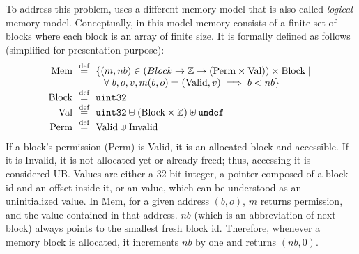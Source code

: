 To address this problem, \cc{} uses a different memory model that is also called {\it logical} memory model.
Conceptually, in this model memory consists of a finite set of blocks where each block is an array of finite size.
It is formally defined as follows (simplified for presentation purpose):
\[
\begin{array}{r@{~~}c@{~~}l}
\textrm{Mem} & \defeq & \{ (m, nb) \in (Block \rightarrow \mathbb{Z} \rightarrow (\textrm{Perm} \times \textrm{Val})) \times \textrm{Block} \; | \; \\
& & \;\;\; \forall \; b, o, v, m(b, o) = (\textrm{Valid}, v) \implies b < nb \} \\
\textrm{Block} & \defeq & \texttt{uint32} \\
\textrm{Val} & \defeq & \texttt{uint32} \uplus (\textrm{Block} \times \mathbb{Z}) \uplus \Undef \\
\textrm{Perm} & \defeq & \textrm{Valid} \uplus \textrm{Invalid} \\
\end{array}
\]
If a block's permission (\textrm{Perm}) is \textrm{Valid}, it is an allocated block and accessible. If it is \textrm{Invalid}, it is not allocated yet or already freed; thus, accessing it is considered UB.
Values are either a 32-bit integer, a pointer composed of a block id and an offset inside it, or an \Undef value, which can be understood as an uninitialized value. %
In $\textrm{Mem}$, for a given address $(b,o)$, $m$ returns permission, and the value contained in that address.
$nb$ (which is an abbreviation of next block) always points to the smallest fresh block id. Therefore, whenever a memory block is allocated, it increments $nb$ by one and returns $(nb, 0)$.

